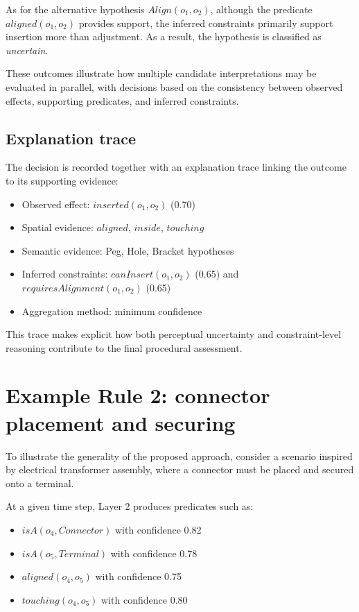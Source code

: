 \documentclass[11pt,titlepage,openright]{book}
\begin{document}
As for the alternative hypothesis $Align(o_1, o_2)$, although the predicate $aligned(o_1, o_2)$ provides support, the inferred constraints primarily support insertion more than adjustment. As a result, the hypothesis is classified as \textit{uncertain}.

These outcomes illustrate how multiple candidate interpretations may be evaluated in parallel, with decisions based on the consistency between observed effects, supporting predicates, and inferred constraints.


\subsection{Explanation trace}

The decision is recorded together with an explanation trace linking the outcome to its supporting evidence:

\begin{itemize}
\item Observed effect: $inserted(o_1, o_2)$ (0.70)
\item Spatial evidence: $aligned$, $inside$, $touching$
\item Semantic evidence: Peg, Hole, Bracket hypotheses
\item Inferred constraints: $canInsert(o_1, o_2)$ (0.65) and $requiresAlignment(o_1, o_2)$ (0.65)
\item Aggregation method: minimum confidence
\end{itemize}

This trace makes explicit how both perceptual uncertainty and constraint-level reasoning contribute to the final procedural assessment.


\section{Example Rule 2: connector placement and securing}

To illustrate the generality of the proposed approach, consider a scenario inspired by electrical transformer assembly, where a connector must be placed and secured onto a terminal.

At a given time step, Layer 2 produces predicates such as:

\begin{itemize}
\item $isA(o_4, Connector)$ with confidence 0.82
\item $isA(o_5, Terminal)$ with confidence 0.78
\item $aligned(o_4, o_5)$ with confidence 0.75
\item $touching(o_4, o_5)$ with confidence 0.80
\end{itemize}
\end{document}
